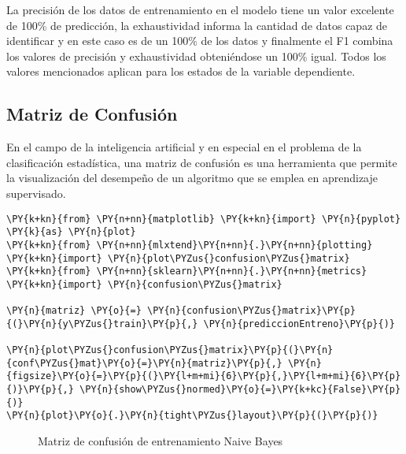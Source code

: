     La precisión de los datos de entrenamiento en el modelo tiene un valor
excelente de 100\% de predicción, la exhaustividad informa la cantidad
de datos capaz de identificar y en este caso es de un 100\% de los datos
y finalmente el F1 combina los valores de precisión y exhaustividad
obteniéndose un 100\% igual. Todos los valores mencionados aplican para
los estados de la variable dependiente.

    \hypertarget{matriz-de-confusiuxf3n}{%
\subsection{Matriz de Confusión}\label{matriz-de-confusiuxf3n}}

En el campo de la inteligencia artificial y en especial en el problema
de la clasificación estadística, una matriz de confusión es una
herramienta que permite la visualización del desempeño de un algoritmo
que se emplea en aprendizaje supervisado.

    \begin{tcolorbox}[breakable, size=fbox, boxrule=1pt, pad at break*=1mm,colback=cellbackground, colframe=cellborder]
\begin{Verbatim}[commandchars=\\\{\}]
\PY{k+kn}{from} \PY{n+nn}{matplotlib} \PY{k+kn}{import} \PY{n}{pyplot} \PY{k}{as} \PY{n}{plot}
\PY{k+kn}{from} \PY{n+nn}{mlxtend}\PY{n+nn}{.}\PY{n+nn}{plotting} \PY{k+kn}{import} \PY{n}{plot\PYZus{}confusion\PYZus{}matrix}
\PY{k+kn}{from} \PY{n+nn}{sklearn}\PY{n+nn}{.}\PY{n+nn}{metrics} \PY{k+kn}{import} \PY{n}{confusion\PYZus{}matrix}

\PY{n}{matriz} \PY{o}{=} \PY{n}{confusion\PYZus{}matrix}\PY{p}{(}\PY{n}{y\PYZus{}train}\PY{p}{,} \PY{n}{prediccionEntreno}\PY{p}{)}

\PY{n}{plot\PYZus{}confusion\PYZus{}matrix}\PY{p}{(}\PY{n}{conf\PYZus{}mat}\PY{o}{=}\PY{n}{matriz}\PY{p}{,} \PY{n}{figsize}\PY{o}{=}\PY{p}{(}\PY{l+m+mi}{6}\PY{p}{,}\PY{l+m+mi}{6}\PY{p}{)}\PY{p}{,} \PY{n}{show\PYZus{}normed}\PY{o}{=}\PY{k+kc}{False}\PY{p}{)}
\PY{n}{plot}\PY{o}{.}\PY{n}{tight\PYZus{}layout}\PY{p}{(}\PY{p}{)}
\end{Verbatim}
\end{tcolorbox}

\begin{center}
    	\begin{figure}[htb]
	\centering
	\caption{Matriz de confusión de entrenamiento Naive Bayes}
	\label{fig:mcenb}
	\end{figure}
\end{center}
    
